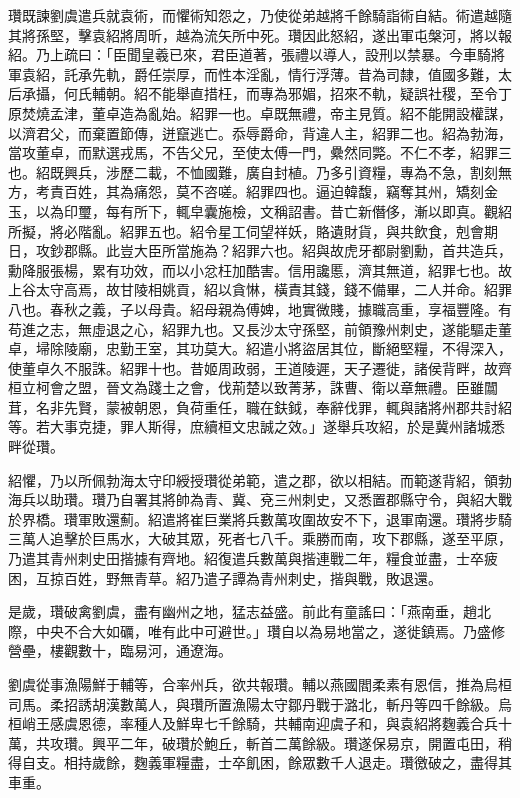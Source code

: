 \begin{pinyinscope}
瓚既諫劉虞遣兵就袁術，而懼術知怨之，乃使從弟越將千餘騎詣術自結。術遣越隨其將孫堅，擊袁紹將周昕，越為流矢所中死。瓚因此怒紹，遂出軍屯槃河，將以報紹。乃上疏曰：「臣聞皇羲已來，君臣道著，張禮以導人，設刑以禁暴。今車騎將軍袁紹，託承先軌，爵任崇厚，而性本淫亂，情行浮薄。昔為司隸，值國多難，太后承攝，何氏輔朝。紹不能舉直措枉，而專為邪媚，招來不軌，疑誤社稷，至令丁原焚燒孟津，董卓造為亂始。紹罪一也。卓既無禮，帝主見質。紹不能開設權謀，以濟君父，而棄置節傳，迸竄逃亡。忝辱爵命，背違人主，紹罪二也。紹為勃海，當攻董卓，而默選戎馬，不告父兄，至使太傅一門，纍然同斃。不仁不孝，紹罪三也。紹既興兵，涉歷二載，不恤國難，廣自封植。乃多引資糧，專為不急，割刻無方，考責百姓，其為痛怨，莫不咨嗟。紹罪四也。逼迫韓馥，竊奪其州，矯刻金玉，以為印璽，每有所下，輒皁囊施檢，文稱詔書。昔亡新僭侈，漸以即真。觀紹所擬，將必階亂。紹罪五也。紹令星工伺望祥妖，賂遺財貨，與共飲食，剋會期日，攻鈔郡縣。此豈大臣所當施為？紹罪六也。紹與故虎牙都尉劉勳，首共造兵，勳降服張楊，累有功效，而以小忿枉加酷害。信用讒慝，濟其無道，紹罪七也。故上谷太守高焉，故甘陵相姚貢，紹以貪惏，橫責其錢，錢不備畢，二人并命。紹罪八也。春秋之義，子以母貴。紹母親為傅婢，地實微賤，據職高重，享福豐隆。有苟進之志，無虛退之心，紹罪九也。又長沙太守孫堅，前領豫州刺史，遂能驅走董卓，埽除陵廟，忠勤王室，其功莫大。紹遣小將盜居其位，斷絕堅糧，不得深入，使董卓久不服誅。紹罪十也。昔姬周政弱，王道陵遲，天子遷徙，諸侯背畔，故齊桓立柯會之盟，晉文為踐土之會，伐荊楚以致菁茅，誅曹、衛以章無禮。臣雖闒茸，名非先賢，蒙被朝恩，負荷重任，職在鈇鉞，奉辭伐罪，輒與諸將州郡共討紹等。若大事克捷，罪人斯得，庶續桓文忠誠之效。」遂舉兵攻紹，於是冀州諸城悉畔從瓚。

紹懼，乃以所佩勃海太守印綬授瓚從弟範，遣之郡，欲以相結。而範遂背紹，領勃海兵以助瓚。瓚乃自署其將帥為青、冀、兗三州刺史，又悉置郡縣守令，與紹大戰於界橋。瓚軍敗還薊。紹遣將崔巨業將兵數萬攻圍故安不下，退軍南還。瓚將步騎三萬人追擊於巨馬水，大破其眾，死者七八千。乘勝而南，攻下郡縣，遂至平原，乃遣其青州刺史田揩據有齊地。紹復遣兵數萬與揩連戰二年，糧食並盡，士卒疲困，互掠百姓，野無青草。紹乃遣子譚為青州刺史，揩與戰，敗退還。

是歲，瓚破禽劉虞，盡有幽州之地，猛志益盛。前此有童謠曰：「燕南垂，趙北際，中央不合大如礪，唯有此中可避世。」瓚自以為易地當之，遂徙鎮焉。乃盛修營壘，樓觀數十，臨易河，通遼海。

劉虞從事漁陽鮮于輔等，合率州兵，欲共報瓚。輔以燕國閻柔素有恩信，推為烏桓司馬。柔招誘胡漢數萬人，與瓚所置漁陽太守鄒丹戰于潞北，斬丹等四千餘級。烏桓峭王感虞恩德，率種人及鮮卑七千餘騎，共輔南迎虞子和，與袁紹將麴義合兵十萬，共攻瓚。興平二年，破瓚於鮑丘，斬首二萬餘級。瓚遂保易京，開置屯田，稍得自支。相持歲餘，麴義軍糧盡，士卒飢困，餘眾數千人退走。瓚徼破之，盡得其車重。


\end{pinyinscope}
